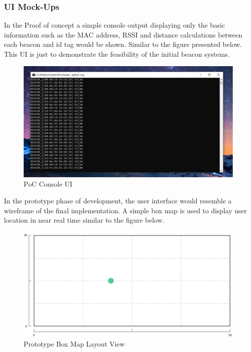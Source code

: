 \pagebreak
\subsubsection{UI Mock-Ups}
\medskip
In the Proof of concept a simple console output displaying only the basic information such as the MAC address, RSSI and distance calculations between each beacon and id tag would be shown. Similar to the figure presented below. This UI is just to demonstrate the feasibility of the initial beacon systems.

\medskip
\begin{figure}[H]
\centering
    \includegraphics[scale=0.5]{./images/UI_PoC.png}
    \caption{PoC Console UI}
    \label{UI_PoC}
\end{figure}
\medskip

In the prototype phase of development, the user interface would resemble a wireframe of the final implementation. A simple box map is used to display user location in near real time similar to the figure below.

\medskip
\begin{figure}[H]
\centering
    \includegraphics[scale=0.6]{./images/UI_box.png}
    \caption{Prototype Box Map Layout View}
    \label{UI_box}
\end{figure}

